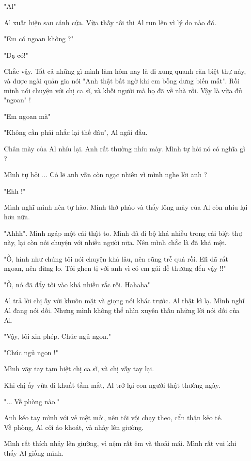 "Al"

Al xuất hiện sau cánh cửa. Vừa thấy tôi thì Al run lên vì lý do nào đó.

"Em có ngoan không ?"

"Dạ có!"

Chắc vậy. Tất cả những gì mình làm hôm nay là đi xung quanh căn biệt thự này, và được ngài quản gia nói "Anh thật bất ngờ khi em bỗng dưng biến mất". Rồi mình nói chuyện với chị ca sĩ, và khối người mà họ đã về nhà rồi. Vậy là vừa đủ "ngoan" !

"Em ngoan mà"

"Không cần phải nhắc lại thế đâu", Al ngãi đầu.

Chân mày của Al nhíu lại. Anh rất thường nhíu mày. Mình tự hỏi nó có nghĩa gì ?

Mình tự hỏi ... Có lẽ anh vẫn còn ngạc nhiên vì mình nghe lời anh ?

"Ehh !"

Mình nghĩ mình nên tự hào. Mình thở phào và thấy lông mày của Al còn nhíu lại hơn nữa.

"Ahhh". Mình ngáp một cái thật to. Mình đã đi bộ khá nhiều trong cái biệt thự này, lại còn nói chuyện với nhiều người nữa. Nên mình chắc là đã khá mệt.

"Ồ, hình như chúng tôi nói chuyện khá lâu, nên cũng trễ quá rồi. Efi đã rất ngoan, nên đừng lo. Tôi ghen tị với anh vì có em gái dễ thương đến vậy !!"

"Ồ, nó đã đẩy tôi vào khá nhiều rắc rối. Hahaha"

Al trả lời chị ấy với khuôn mặt và giọng nói khác trước. Al thật kì lạ. Mình nghĩ Al đang nói dối. Nhưng mình không thể nhìn xuyên thấu những lời nói dối của Al.

"Vậy, tôi xin phép. Chúc ngủ ngon."

"Chúc ngủ ngon !"

Mình vãy tay tạm biệt chị ca sĩ, và chị vẫy tay lại.

Khi chị ấy vừa đi khuất tầm mắt, Al trở lại con người thật thường ngày.

"... Về phòng nào."

Anh kéo tay mình với vẻ mệt mỏi, nên tôi vội chạy theo, cẩn thận kẻo té.\\


Về phòng, Al cởi áo khoát, và nhảy lên giường.

Mình rất thích nhảy lên giường, vì nệm rất êm và thoải mái. Mình rất vui khi thấy Al giống mình.

